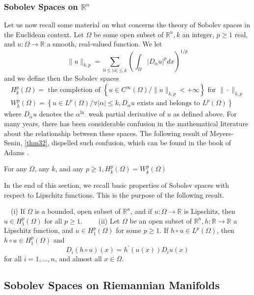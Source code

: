 \documentclass[12pt,hyperref,a4paper,UTF8]{ctexart}
\begin{document}
\subsubsection{Sobolev Spaces on ${\mathbb{R}^n}$}
Let us now recall some material on what concerns the theory of Sobolev spaces in the Euclidean context. Let $\Omega$ be some open subset of $\mathbb{R}^n, k$ an integer, $p \geq 1$ real, and $u: \Omega \rightarrow \mathbb{R}$ a smooth, real-valued function. We let
$$
\|u\|_{k, p}=\sum_{0 \leq|\alpha| \leq k}\left(\int_{\Omega}\left|D_\alpha u\right|^p d x\right)^{1 / p}
$$
and we define then the Sobolev spaces
$$
\begin{array}{l}
H_k^p(\Omega)=\text { the completion of }\left\{u \in C^{\infty}(\Omega) /\|u\|_{k, p}<+\infty\right\} \text { for }\|\cdot\|_{k, p} \\
W_k^p(\Omega)=\left\{u \in L^p(\Omega) / \forall|\alpha| \leq k, D_\alpha u \text { exists and belongs to } L^p(\Omega)\right\}
\end{array}
$$
where $D_\alpha u$ denotes the $\alpha^{\text {ln }}$ weak partial derivative of $u$ as defined above. 
For many years, there has been considerable confusion in the mathematical literature about the relationship between these spaces. 
The following result of Meyers-Senin, \autoref{thm32}, dispelled such confusion, which can be found in the book of Adams \cite{A}. 
\begin{Theorem}
    For any $\Omega$, any $k$, and any $p \geq 1, H_k^p(\Omega)=W_k^p(\Omega)$
\label{thm32}
\end{Theorem}

In the end of this section, we recall basic properties of Sobolev spaces with respect to Lipschitz functions. This is the purpose of the following result.\cite{A} 

\begin{Theorem}
    ~~(i) If $\Omega$ is a bounded, open subset of $\mathbb{R}^n$, and if $u: \Omega \rightarrow \mathbb{R}$ is Lipschitz, then $u \in H_1^p(\Omega)$ for all $p \geq 1$.
    ~~~~(ii) Let $\Omega$ be an open subset of $\mathbb{R}^n, h: \mathbb{R} \rightarrow \mathbb{R}$ a Lipschitz function, and $u \in H_1^p(\Omega)$ for some $p \geq 1$. If $h \circ u \in L^p(\Omega)$, then $h \circ u \in H_1^p(\Omega)$ and
    $$
    D_i(h \circ u)(x)=h^{\prime}(u(x)) D_i u(x)
    $$
    for all $i=1, \ldots, n$, and almost all $x \in \Omega$.
\label{thm33}    
\end{Theorem}

\subsection{Sobolev Spaces on Riemannian Manifolds}
\end{document}
